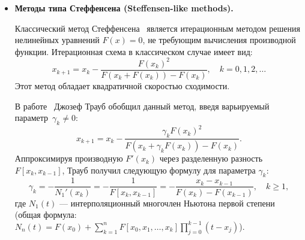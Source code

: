 \documentclass[12pt,a4paper]{article}
\theoremstyle{bigplain}
\theoremstyle{plain}
\begin{document}
\begin{itemize}
Метод Брента применяет следующую стратегию выбора поправки $d = \frac{P}{Q}$:
\begin{itemize}
    \item \textbf{Обратная квадратичная интерполяция}: используется, если все три текущих значения $F(a), F(b), F(c)$ попарно различны.
    \item \textbf{Метод секущих}: применяется, если $F(a) = F(c)$ (ситуация $F(b)=F(c)$ невозможна из-за условия локализации $F(b)F(c)<0$, а при $F(a)=F(b)$ возникает деление на ноль, что немедленно запускает шаг дихотомии). Формула упрощается до линейной интерполяции: $P = S(c - b)$, $Q = S - 1$.
    \item \textbf{Метод дихотомии}: применяется, если новое приближение $b + d$ выходит за его границы, интерполяционный шаг убывает менее чем в два раза по сравнению с прошлыми итерациями, или достигнут предел заданной точности.
\end{itemize}

Метод сходится сверхлинейно ($p \approx 1.84$) на гладких
функциях, гарантируя в худшем случае линейную скорость сходимости
\cite{Press}.



\item \textbf{Методы типа Стеффенсена (Steffensen-like methods).}

Классический метод Стеффенсена~\cite{Steffensen} является итерационным
методом решения нелинейных уравнений $F(x)=0$, не требующим вычисления
производной функции. Итерационная схема в классическом случае имеет вид:
\begin{equation}
    x_{k+1} = x_k - \frac{F(x_k)^2}{F(x_k + F(x_k)) - F(x_k)}, \quad k = 0, 1, 2, \dots
    \tag{4.2}
    \label{eq:original_steffensen}
\end{equation}
Этот метод обладает квадратичной скоростью сходимости.

В работе~\cite{Traub} Джозеф Трауб обобщил данный метод, введя варьируемый параметр~$\gamma_k \neq 0$:
\[
x_{k+1} = x_k - \frac{\gamma_k F(x_k)^2}{F(x_k + \gamma_k F(x_k)) - F(x_k)}.
\]
Аппроксимируя производную $F'(x_k)$ через разделенную
разность $F[x_k, x_{k-1}]$, Трауб получил следующую формулу для
параметра $\gamma_k$:
\[
\gamma_k = -\frac{1}{N_1'(x_k)} = - \frac{1}{F[x_k, x_{k-1}]} = - \frac{x_k - x_{k-1}}{F(x_k) - F(x_{k-1})}, \quad k \ge 1,
\]
где $N_1(t)$ — интерполяционный многочлен Ньютона первой степени (общая формула: $N_n(t) = F(x_0) + \sum_{k=1}^{n} F[x_0, x_1, \dots, x_k] \prod_{j=0}^{k-1} (t - x_j)$).


\end{itemize}
\end{document}
